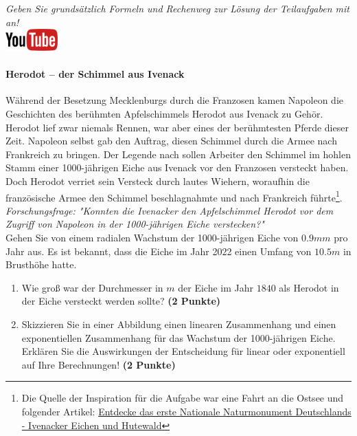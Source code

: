 \documentclass[a4paper, 9pt]{scrartcl}\usepackage[]{graphicx}\usepackage[]{xcolor}
\begin{document}
\textit{Geben Sie grunds{\"a}tzlich Formeln und Rechenweg zur L{\"o}sung der
  Teilaufgaben mit an!} \\[1Ex]

\hfill\href{https://youtu.be/Fu8kN0Uj13Y}{\includegraphics[width =
  2cm]{img/youtube}} %
\hspace{2Ex}

\paragraph{Herodot – der Schimmel aus Ivenack}

W{\"a}hrend der Besetzung Mecklenburgs durch die Franzosen kamen Napoleon die
Geschichten des ber{\"u}hmten Apfelschimmels Herodot aus Ivenack zu
Geh{\"o}r. Herodot lief zwar niemals Rennen, war aber eines der ber{\"u}hmtesten
Pferde dieser Zeit. Napoleon selbst gab den Auftrag, diesen
Schimmel durch die Armee nach Frankreich zu bringen. Der Legende nach
sollen Arbeiter den Schimmel im hohlen Stamm einer 1000-j{\"a}hrigen Eiche aus Ivenack vor
den Franzosen versteckt haben. Doch Herodot verriet sein Versteck durch
lautes Wiehern, woraufhin die franz{\"o}sische Armee den Schimmel
beschlagnahmte und nach Frankreich f{\"u}hrte\footnote{Die Quelle der Inspiration
  für die Aufgabe war eine Fahrt an die Ostsee und folgender Artikel:
  \href{https://www.wald-mv.de/landingpage/ivenacker-eichen/}{Entdecke das erste Nationale Naturmonument Deutschlands - Ivenacker Eichen und Hutewald}}. \\



\textit{Forschungsfrage: "Konnten die Ivenacker den Apfelschimmel Herodot
  vor dem Zugriff von Napoleon in der 1000-j{\"a}hrigen Eiche verstecken?"} \\

Gehen Sie von einem radialen Wachstum der 1000-j{\"a}hrigen Eiche von
$0.9mm$ pro Jahr aus. Es ist bekannt, dass die Eiche im
Jahr 2022 einen Umfang von $10.5m$ in Brusth{\"o}he hatte.

\begin{enumerate}
\item Wie gro{\ss} war der Durchmesser in $m$ der Eiche im Jahr $1840$ als
  Herodot in der Eiche versteckt werden sollte?
  \textbf{(2 Punkte)}
\item Skizzieren Sie in einer Abbildung einen linearen Zusammenhang und einen
exponentiellen Zusammenhang f{\"u}r das Wachstum der 1000-j{\"a}hrigen Eiche. Erkl{\"a}ren Sie die
Auswirkungen der Entscheidung f{\"u}r linear oder exponentiell auf Ihre
Berechnungen! \textbf{(2 Punkte)}
\end{enumerate}
 
\end{document}
